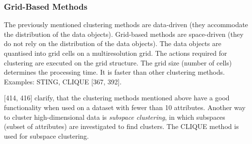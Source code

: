  

\subsubsection{Grid-Based Methods}
The previously mentioned clustering methods are data-driven (they accommodate the distribution of the data objects). Grid-based methods are space-driven (they do not rely on the distribution of the data objects). The data objects are quantised into grid cells on a multiresolution grid. The actions required for clustering are executed on the grid structure. The grid size (number of cells) determines the processing time. It is faster than other clustering methods. Examples: STING, CLIQUE \autocite{han2011data}[367, 392].

  

\vspace{5mm} %
\textcite{han2011data}[414, 416] clarify, that the clustering methods mentioned above have a good functionality when used on a dataset with fewer than 10 attributes. Another way to cluster high-dimensional data is \textit{subspace clustering}, in which subspaces (subset of attributes) are investigated to find clusters. The CLIQUE method is used for subspace clustering. 


